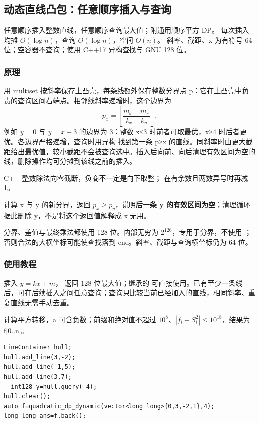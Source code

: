 \subsection{动态直线凸包：任意顺序插入与查询}
\label{dp:line-container}
\AlgorithmInfo
    {任意顺序插入整数直线，任意顺序查询最大值；附通用顺序平方 DP。}
    {每次插入均摊 $O(\log n)$，查询 $O(\log n)$，空间 $O(n)$。}
    {斜率、截距、x 为有符号 64 位；空容器不查询；使用 C++17 异构查找与 GNU 128 位。}
\subsubsection*{原理}

用 multiset 按斜率保存上凸壳，每条线额外保存整数分界点 p：它在上凸壳中负责的查询区间右端点。相邻线斜率递增时，这个边界为
\[
 p_x=\left\lfloor\frac{m_y-m_x}{k_x-k_y}\right\rfloor.
\]
例如 $y=0$ 与 $y=x-3$ 的边界为 3：整数 x≤3 时前者可取最优，x≥4 时后者更优。各边界严格递增，查询时用异构  找到第一条 p≥x 的直线。同斜率时由更大截距给出最优值，较小截距不会被查询选中。插入后向前、向后清理有效区间为空的线，删除操作均可分摊到该线之前的插入。

C++ 整数除法向零截断，负商不一定是向下取整； 在有余数且两数异号时再减 1。

 计算 x 与 y 的新分界，返回 $p_x\ge p_y$，说明\textbf{后一条 y 的有效区间为空}；清理循环据此删除 y，不是将这个返回值解释成 x 无用。

分界、差值与最终乘法都使用 128 位。内部无穷为 $2^{126}$，专用于分界，不使用 ；否则合法的大横坐标可能使查找落到 end。斜率、截距与查询横坐标仍为 64 位。

\subsubsection*{使用教程}
 插入 $y=kx+m$， 返回 128 位最大值；继承的  可直接使用。已有至少一条线后，可在后续插入之间任意查询；查询只比较当前已经加入的直线，相同斜率、重复直线无需手动去重。

 计算平方转移，a 可含负数；前缀和绝对值不超过 $10^8$、$|f_i+S_i^2|\le10^{18}$，结果为 f[0..n]。
\begin{lstlisting}[style=mtycpp,numbers=none]
LineContainer hull;
hull.add_line(3,-2);
hull.add_line(-1,5);
hull.add_line(3,7);
__int128 y=hull.query(-4);
hull.clear();
auto f=quadratic_dp_dynamic(vector<long long>{0,3,-2,1},4);
long long ans=f.back();
\end{lstlisting}

